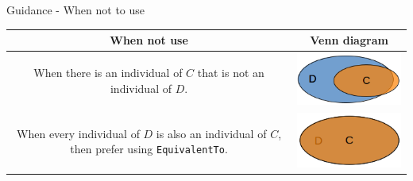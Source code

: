 \documentclass{beamer}
\begin{document}
{\begin{block}{Guidance - When not to use}
\begin{table}
\begin{center}
\begin{small}
				\begin{tabular}{|c|c|} 
					\hline					
					\textbf{When not use}&\textbf{Venn diagram}\\
					\hline 
					\begin{minipage}{6cm}
						When there is an individual of $C$ that is not an individual of $D$.
					\end{minipage}									
					& 
					\begin{minipage}{4cm}
						\includegraphics[trim = 0mm 1mm 0mm 1mm, clip, scale=0.4]{./images/SubClassOfWhenNotToUse.png}
					\end{minipage}										
					\\
					\hline 
					\begin{minipage}{6cm}
						When every individual of $D$ is also an individual of $C$, then prefer using \texttt{EquivalentTo}.
					\end{minipage}									
					& 
					\begin{minipage}{4cm}
						\includegraphics[trim = 0mm 1mm 0mm 1mm, clip, scale=0.4]{./images/EquivalentTo.png}
					\end{minipage}										
					\\					
					\hline						 				  
				\end{tabular}
			\end{small}
		\end{center}
	\end{table}
	\end{block}
}
\end{document}
